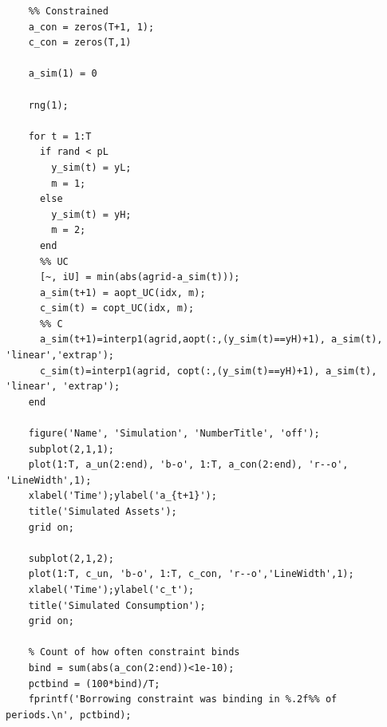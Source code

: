 \documentclass[10pt,a4paper]{article}
\begin{document}
\begin{lstlisting}
    %% Constrained
    a_con = zeros(T+1, 1);
    c_con = zeros(T,1)

    a_sim(1) = 0

    rng(1);

    for t = 1:T
      if rand < pL
        y_sim(t) = yL;
        m = 1;
      else
        y_sim(t) = yH;
        m = 2;
      end
      %% UC
      [~, iU] = min(abs(agrid-a_sim(t)));
      a_sim(t+1) = aopt_UC(idx, m);
      c_sim(t) = copt_UC(idx, m);
      %% C
      a_sim(t+1)=interp1(agrid,aopt(:,(y_sim(t)==yH)+1), a_sim(t), 'linear','extrap');
      c_sim(t)=interp1(agrid, copt(:,(y_sim(t)==yH)+1), a_sim(t), 'linear', 'extrap');
    end

    figure('Name', 'Simulation', 'NumberTitle', 'off');
    subplot(2,1,1);
    plot(1:T, a_un(2:end), 'b-o', 1:T, a_con(2:end), 'r--o', 'LineWidth',1);
    xlabel('Time');ylabel('a_{t+1}');
    title('Simulated Assets');
    grid on;

    subplot(2,1,2);
    plot(1:T, c_un, 'b-o', 1:T, c_con, 'r--o','LineWidth',1);
    xlabel('Time');ylabel('c_t');
    title('Simulated Consumption');
    grid on;

    % Count of how often constraint binds
    bind = sum(abs(a_con(2:end))<1e-10);
    pctbind = (100*bind)/T;
    fprintf('Borrowing constraint was binding in %.2f%% of periods.\n', pctbind);
  \end{lstlisting}
\end{document}
